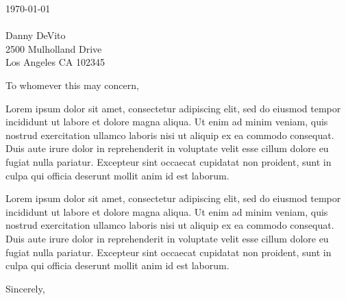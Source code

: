 \documentclass[myletter, a4paper, 11pt]{scrlttr2}
\begin{document}
\begin{letter}{\today \\ \hfill \\ Danny DeVito \\2500 Mulholland Drive \\Los Angeles CA 102345}

\opening{To whomever this may concern,}

Lorem ipsum dolor sit amet, consectetur adipiscing elit, sed do eiusmod tempor incididunt ut labore et dolore magna aliqua. Ut enim ad minim veniam, quis nostrud exercitation ullamco laboris nisi ut aliquip ex ea commodo consequat. Duis aute irure dolor in reprehenderit in voluptate velit esse cillum dolore eu fugiat nulla pariatur. Excepteur sint occaecat cupidatat non proident, sunt in culpa qui officia deserunt mollit anim id est laborum.

Lorem ipsum dolor sit amet, consectetur adipiscing elit, sed do eiusmod tempor incididunt ut labore et dolore magna aliqua. Ut enim ad minim veniam, quis nostrud exercitation ullamco laboris nisi ut aliquip ex ea commodo consequat. Duis aute irure dolor in reprehenderit in voluptate velit esse cillum dolore eu fugiat nulla pariatur. Excepteur sint occaecat cupidatat non proident, sunt in culpa qui officia deserunt mollit anim id est laborum.


\closing{Sincerely,}


\end{letter}
\end{document}
